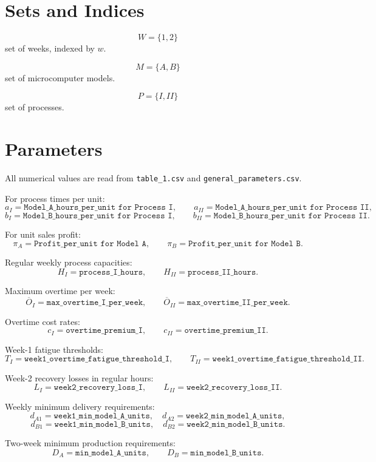 \section*{Sets and Indices}

\[
W=\{1,2\}
\]
set of weeks, indexed by \(w\).

\[
M=\{A,B\}
\]
set of microcomputer models.

\[
P=\{I,II\}
\]
set of processes.

\section*{Parameters}

All numerical values are read from \texttt{table\_1.csv} and \texttt{general\_parameters.csv}.

For process times per unit:
\[
a_I=\texttt{Model\_A\_hours\_per\_unit for Process I},\qquad
a_{II}=\texttt{Model\_A\_hours\_per\_unit for Process II},
\]
\[
b_I=\texttt{Model\_B\_hours\_per\_unit for Process I},\qquad
b_{II}=\texttt{Model\_B\_hours\_per\_unit for Process II}.
\]

For unit sales profit:
\[
\pi_A=\texttt{Profit\_per\_unit for Model A},\qquad
\pi_B=\texttt{Profit\_per\_unit for Model B}.
\]

Regular weekly process capacities:
\[
H_I=\texttt{process\_I\_hours},\qquad H_{II}=\texttt{process\_II\_hours}.
\]

Maximum overtime per week:
\[
\overline{O}_I=\texttt{max\_overtime\_I\_per\_week},\qquad
\overline{O}_{II}=\texttt{max\_overtime\_II\_per\_week}.
\]

Overtime cost rates:
\[
c_I=\texttt{overtime\_premium\_I},\qquad
c_{II}=\texttt{overtime\_premium\_II}.
\]

Week-1 fatigue thresholds:
\[
T_I=\texttt{week1\_overtime\_fatigue\_threshold\_I},\qquad
T_{II}=\texttt{week1\_overtime\_fatigue\_threshold\_II}.
\]

Week-2 recovery losses in regular hours:
\[
L_I=\texttt{week2\_recovery\_loss\_I},\qquad
L_{II}=\texttt{week2\_recovery\_loss\_II}.
\]

Weekly minimum delivery requirements:
\[
d_{A1}=\texttt{week1\_min\_model\_A\_units},\quad
d_{A2}=\texttt{week2\_min\_model\_A\_units},
\]
\[
d_{B1}=\texttt{week1\_min\_model\_B\_units},\quad
d_{B2}=\texttt{week2\_min\_model\_B\_units}.
\]

Two-week minimum production requirements:
\[
D_A=\texttt{min\_model\_A\_units},\qquad
D_B=\texttt{min\_model\_B\_units}.
\]

